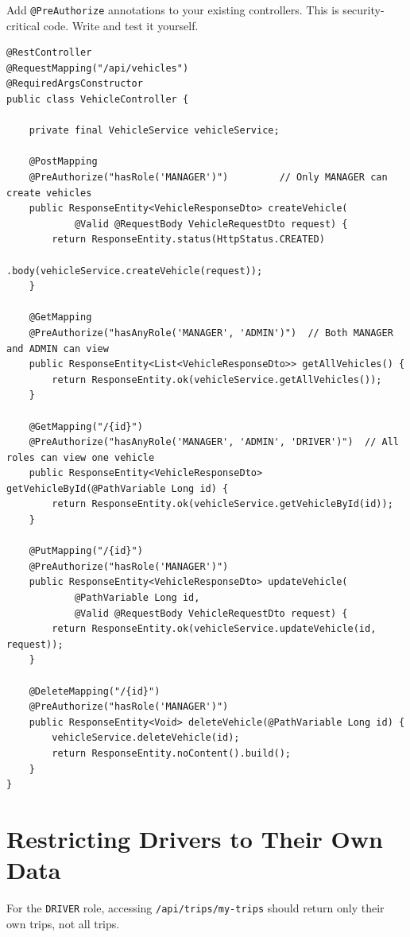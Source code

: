 \documentclass[12pt,a4paper]{report}
\newcommand{\code}[1]{\texttt{\textcolor{keywordblue}{#1}}}
\begin{document}
\begin{tcolorbox}[handbox]
Add \code{@PreAuthorize} annotations to your existing controllers. This is security-critical code. Write and test it yourself.
\end{tcolorbox}

\begin{lstlisting}[caption=VehicleController.java -- Updated with RBAC]
@RestController
@RequestMapping("/api/vehicles")
@RequiredArgsConstructor
public class VehicleController {

    private final VehicleService vehicleService;

    @PostMapping
    @PreAuthorize("hasRole('MANAGER')")         // Only MANAGER can create vehicles
    public ResponseEntity<VehicleResponseDto> createVehicle(
            @Valid @RequestBody VehicleRequestDto request) {
        return ResponseEntity.status(HttpStatus.CREATED)
                             .body(vehicleService.createVehicle(request));
    }

    @GetMapping
    @PreAuthorize("hasAnyRole('MANAGER', 'ADMIN')")  // Both MANAGER and ADMIN can view
    public ResponseEntity<List<VehicleResponseDto>> getAllVehicles() {
        return ResponseEntity.ok(vehicleService.getAllVehicles());
    }

    @GetMapping("/{id}")
    @PreAuthorize("hasAnyRole('MANAGER', 'ADMIN', 'DRIVER')")  // All roles can view one vehicle
    public ResponseEntity<VehicleResponseDto> getVehicleById(@PathVariable Long id) {
        return ResponseEntity.ok(vehicleService.getVehicleById(id));
    }

    @PutMapping("/{id}")
    @PreAuthorize("hasRole('MANAGER')")
    public ResponseEntity<VehicleResponseDto> updateVehicle(
            @PathVariable Long id,
            @Valid @RequestBody VehicleRequestDto request) {
        return ResponseEntity.ok(vehicleService.updateVehicle(id, request));
    }

    @DeleteMapping("/{id}")
    @PreAuthorize("hasRole('MANAGER')")
    public ResponseEntity<Void> deleteVehicle(@PathVariable Long id) {
        vehicleService.deleteVehicle(id);
        return ResponseEntity.noContent().build();
    }
}
\end{lstlisting}

\section{Restricting Drivers to Their Own Data}

For the \code{DRIVER} role, accessing \code{/api/trips/my-trips} should return only their own trips, not all trips.
\end{document}
